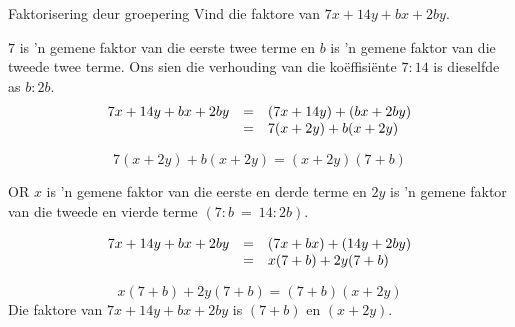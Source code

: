\begin{wex}{Faktorisering deur groepering }{Vind die faktore van $7x+14y+bx+2by$.}
{


 $7$ is ’n gemene faktor van die eerste twee terme en $b$ is ’n gemene faktor van die tweede twee terme. Ons sien die verhouding van die ko\"effisi\"ente $7:14$ is dieselfde as $b:2b$.
\begin{equation*}
 \begin{array}{ccl}

7x+14y+bx+2by&=& (7x+14y)+(bx+2by)  \hfill\\ 
&=&7(x+2y)+b(x+2y) \hfill 
\end{array}
\end{equation*}


\begin{equation*}
7(x+2y)+b(x+2y)=(x+2y)(7+b)
\end{equation*}
% 
\par 
\large{OR}
% 
% 
% 
$x$ is 'n gemene faktor van die eerste en derde terme en $2y$ is 'n gemene faktor van die tweede en vierde terme $(7:b~=~14:2b)$.\par 
{}

\begin{equation*}
 \begin{array}{ccl}

7x+14y+bx+2by&=& (7x+bx)+(14y+2by)  \hfill\\ 
&=&x(7+b)+2y(7+b) \hfill 
\end{array}
\end{equation*}


\begin{equation*}
x(7+b)+2y(7+b) = (7+b)(x+2y)
\end{equation*}
Die faktore van $7x+14y+bx+2by$ is $(7+b)$ en $(x+2y)$.
}
\end{wex}


